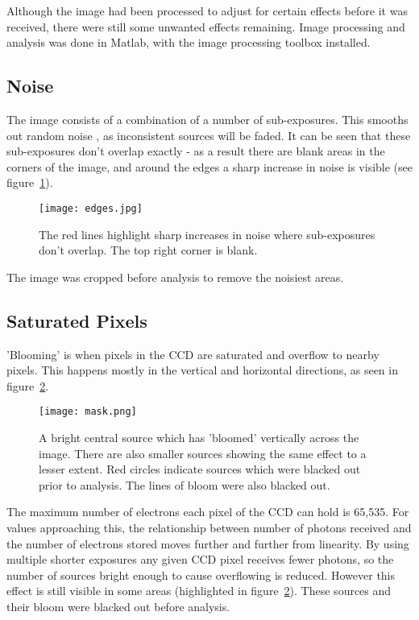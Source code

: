 \documentclass[a4paper,11pt,twoside]{article}
\begin{document}
Although the image had been processed to adjust for certain effects 
before it was received, there were still some unwanted effects 
remaining. Image processing and analysis was done in Matlab, with 
the image processing toolbox installed.

\subsection{Noise}

The image consists of a combination of a number of sub-exposures. 
This smooths out random noise , as inconsistent 
sources will be faded. It can be seen that these sub-exposures 
don't overlap exactly - as a result there 
are blank areas in the corners of the image, and around the edges a 
sharp increase in noise is visible (see figure~\ref{fig:edges}). 

\begin{figure}[htb]
  \centering
  \texttt{[image: edges.jpg]}
  \caption{The red lines highlight sharp increases in noise where 
sub-exposures don't overlap. The top right corner is blank.}
  \label{fig:edges}
\end{figure}

The image was cropped before analysis to remove the noisiest areas.

\subsection{Saturated Pixels}
'Blooming' is when pixels in the CCD are saturated and overflow 
to nearby pixels. This  happens mostly in the vertical
 and horizontal directions, as seen in figure~\ref{fig:mask}.

\begin{figure}[htb]
  \centering
  \texttt{[image: mask.png]}
  \caption{A bright central source which has 'bloomed' vertically across
 the image. There are also smaller sources showing the same effect to 
a lesser extent. Red circles indicate sources which were blacked out 
prior to analysis. The lines of bloom were also blacked out.}
  \label{fig:mask}
\end{figure}

The maximum number of electrons each pixel of the CCD can hold is 65,535. 
For values approaching this, the relationship between number of photons 
received and the number of electrons stored moves further and further 
from linearity. By using multiple shorter exposures any given CCD pixel 
receives fewer photons, so the number of sources bright enough to cause 
overflowing is reduced. However this effect is still visible in some areas 
(highlighted in figure~\ref{fig:mask}). These sources and their bloom were
 blacked out before analysis.
\end{document}
